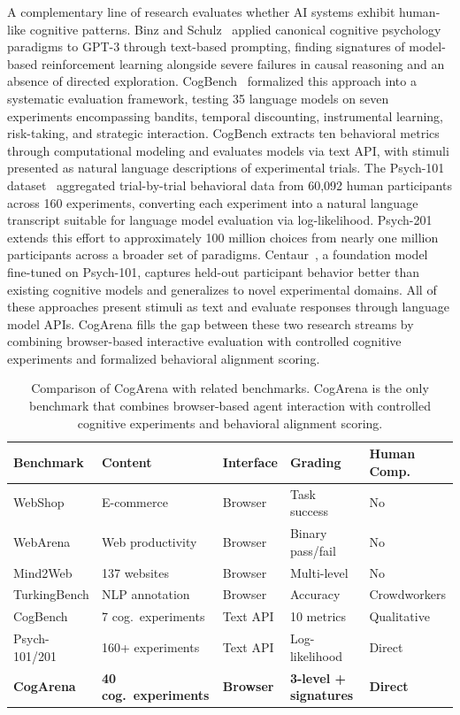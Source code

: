 \documentclass{article}
\begin{document}
A complementary line of research evaluates whether AI systems exhibit human-like cognitive patterns. Binz and Schulz~\citep{binz2023using} applied canonical cognitive psychology paradigms to GPT-3 through text-based prompting, finding signatures of model-based reinforcement learning alongside severe failures in causal reasoning and an absence of directed exploration. CogBench~\citep{codaforno2024cogbench} formalized this approach into a systematic evaluation framework, testing 35 language models on seven experiments encompassing bandits, temporal discounting, instrumental learning, risk-taking, and strategic interaction. CogBench extracts ten behavioral metrics through computational modeling and evaluates models via text API, with stimuli presented as natural language descriptions of experimental trials. The Psych-101 dataset~\citep{binz2024psych101} aggregated trial-by-trial behavioral data from 60,092 human participants across 160 experiments, converting each experiment into a natural language transcript suitable for language model evaluation via log-likelihood. Psych-201~\citep{binz2025psych201} extends this effort to approximately 100 million choices from nearly one million participants across a broader set of paradigms. Centaur~\citep{binz2025centaur}, a foundation model fine-tuned on Psych-101, captures held-out participant behavior better than existing cognitive models and generalizes to novel experimental domains. All of these approaches present stimuli as text and evaluate responses through language model APIs. CogArena fills the gap between these two research streams by combining browser-based interactive evaluation with controlled cognitive experiments and formalized behavioral alignment scoring.

\begin{table}[t]
\caption{Comparison of CogArena with related benchmarks. CogArena is the only benchmark that combines browser-based agent interaction with controlled cognitive experiments and behavioral alignment scoring.}
\label{tab:comparison}
\centering
\small
\begin{tabular}{@{}lllll@{}}
\toprule
\textbf{Benchmark} & \textbf{Content} & \textbf{Interface} & \textbf{Grading} & \textbf{Human Comp.} \\
\midrule
WebShop & E-commerce & Browser & Task success & No \\
WebArena & Web productivity & Browser & Binary pass/fail & No \\
Mind2Web & 137 websites & Browser & Multi-level & No \\
TurkingBench & NLP annotation & Browser & Accuracy & Crowdworkers \\
CogBench & 7 cog.\ experiments & Text API & 10 metrics & Qualitative \\
Psych-101/201 & 160+ experiments & Text API & Log-likelihood & Direct \\
\midrule
\textbf{CogArena} & \textbf{40 cog.\ experiments} & \textbf{Browser} & \textbf{3-level + signatures} & \textbf{Direct} \\
\bottomrule
\end{tabular}
\end{table}
\end{document}
